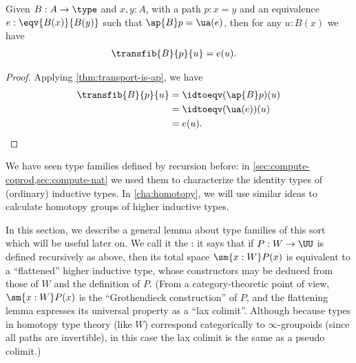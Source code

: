 \begin{lem}\label{thm:transport-is-given}
  Given $B:A\to\type$ and $x,y:A$, with a path $p:x=y$ and an equivalence $e:\eqv{B(x)}{B(y)}$ such that $\ap{B}p = \ua(e)$, then for any $u:B(x)$ we have
  \begin{align*}
    \transfib{B}{p}{u} &= e(u).
  \end{align*}
\end{lem}
\begin{proof}
  Applying \cref{thm:transport-is-ap}, we have
  \begin{align*}
    \transfib{B}{p}{u} &= \idtoeqv(\ap{B}p)(u)\\
    &= \idtoeqv(\ua(e))(u)\\
    &= e(u).\qedhere
  \end{align*}
\end{proof}

We have seen type families defined by recursion before: in \cref{sec:compute-coprod,sec:compute-nat} we used them to characterize the identity types of (ordinary) inductive types.
In \cref{cha:homotopy}, we will use similar ideas to calculate homotopy groups of higher inductive types.

In this section, we describe a general lemma about type families of this sort which will be useful later on.
We call it the :
%
%
it says that if $P:W\to\UU$ is defined recursively as above, then its total space $\sm{x:W} P(x)$ is equivalent to a ``flattened'' higher inductive type, whose constructors may be deduced from those of $W$ and the definition of $P$.
(From a category-theoretic point of view, $\sm{x:W} P(x)$ is the ``Grothendieck construction'' of $P$, and the flattening lemma expresses its universal property as a ``lax colimit''.  Although because types in homotopy type theory (like $W$) correspond categorically to $\infty$-groupoids (since all paths are invertible), in this case the lax colimit is the same as a pseudo colimit.)


